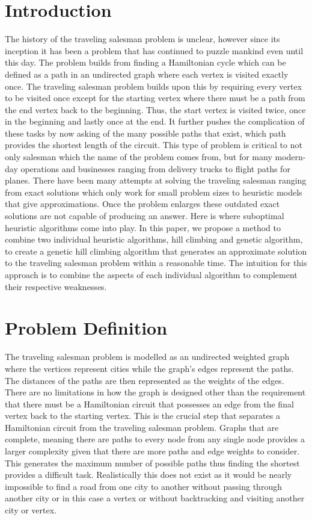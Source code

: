 \documentclass[sigplan,screen]{acmart}
\begin{document}
\section{Introduction}
The history of the traveling salesman problem is unclear, however since its
inception it has been a problem that has continued to puzzle mankind even until
this day. The problem builds from finding a Hamiltonian cycle which can be
defined as a path in an undirected graph where each vertex is visited exactly
once. The traveling salesman problem builds upon this by requiring every vertex
to be visited once except for the starting vertex where there must be a path
from the end vertex back to the beginning. Thus, the start vertex is visited
twice, once in the beginning and lastly once at the end. It further pushes the
complication of these tasks by now asking of the many possible paths that exist,
which path provides the shortest length of the circuit. This type of problem is
critical to not only salesman which the name of the problem comes from, but for
many modern-day operations and businesses ranging from delivery trucks to flight
paths for planes. There have been many attempts at solving the traveling
salesman ranging from exact solutions which only work for small problem sizes to
heuristic models that give approximations. Once the problem enlarges these
outdated exact solutions are not capable of producing an answer. Here is where
suboptimal heuristic algorithms come into play.  In this paper, we propose a
method to combine two individual heuristic algorithms, hill climbing and genetic
algorithm, to create a genetic hill climbing algorithm that generates an
approximate solution to the traveling salesman problem within a reasonable time.
The intuition for this approach is to combine the aspects of each individual
algorithm to complement their respective weaknesses.

\section{Problem Definition}
The traveling salesman problem is modelled as an undirected weighted graph where
the vertices represent cities while the graph’s edges represent the paths. The
distances of the paths are then represented as the weights of the edges. There
are no limitations in how the graph is designed other than the requirement that
there must be a Hamiltonian circuit that possesses an edge from the final vertex
back to the starting vertex. This is the crucial step that separates a
Hamiltonian circuit from the traveling salesman problem. Graphs that are
complete, meaning there are paths to every node from any single node provides a
larger complexity given that there are more paths and edge weights to consider.
This generates the maximum number of possible paths thus finding the shortest
provides a difficult task. Realistically this does not exist as it would be
nearly impossible to find a road from one city to another without passing
through another city or in this case a vertex or without backtracking and
visiting another city or vertex.
\end{document}
